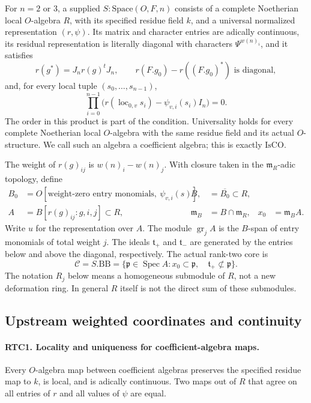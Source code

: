 For \(n=2\) or \(3\), a supplied
\(S:\mathrm{Space}(O,F,n)\) consists of a complete Noetherian
local \(O\)-algebra \(R\), with its specified residue field \(k\),
and a universal normalized representation \((r,\psi)\).  Its
matrix and character entries are adically continuous, its residual
representation is literally diagonal with characters
\(\Psi^{w(n)_i}\), and it satisfies
\[
 r(g^*)=J_nr(g)^tJ_n,\qquad
 r(F.g_0)-r((F.g_0)^*)\text{ is diagonal},
                                                        \tag{RTC.2}
\]
and, for every local tuple \((s_0,\ldots,s_{n-1})\),
\[
 \prod_{i=0}^{n-1}
 \bigl(r(\operatorname{loc}_{0,v}s_i)-\psi_{v,i}(s_i)I_n\bigr)=0.
                                                        \tag{RTC.3}
\]
The order in this product is part of the condition.  Universality
holds for every complete Noetherian local \(O\)-algebra with the
same residue field and its actual \(O\)-structure.  We call such
an algebra a coefficient algebra; this is exactly \(\mathrm{IsCO}\).

The weight of \(r(g)_{ij}\) is \(w(n)_i-w(n)_j\).
With closure taken in the \(\mathfrak m_R\)-adic topology, define
\[
 \begin{aligned}
 B_0&=O[\text{weight-zero entry monomials},\ \psi_{v,i}(s)],
       &B&=\overline{B_0}\subset R,\\
 A&=B[r(g)_{ij}:g,i,j]\subset R,
       &\mathfrak m_B&=B\cap\mathfrak m_R,
       &x_0&=\mathfrak m_B A.
 \end{aligned}                                             \tag{RTC.4}
\]
Write \(u\) for the representation over \(A\).  The module
\(\operatorname{gr}_j A\) is the \(B\)-span of entry monomials
of total weight \(j\).  The ideals \(\mathfrak t_+\) and
\(\mathfrak t_-\) are generated by the entries below and above
the diagonal, respectively.  The actual rank-two core is
\[
 \mathcal C= S.\mathrm{BB}
 =\{\mathfrak p\in\operatorname{Spec}A:
       x_0\subset\mathfrak p,\quad
       \mathfrak t_+\not\subset\mathfrak p\}.
                                                        \tag{RTC.5}
\]
The notation \(R_j\) below means a homogeneous submodule of \(R\),
not a new deformation ring.  In general \(R\) itself is not the
direct sum of these submodules.

\subsection{Upstream weighted coordinates and continuity}

\paragraph{RTC1. Locality and uniqueness for coefficient-algebra maps.}
\label{claim:RTC1}
Every \(O\)-algebra map between coefficient algebras preserves the
specified residue map to \(k\), is local, and is adically continuous.
Two maps out of \(R\) that agree on all entries of \(r\) and all
values of \(\psi\) are equal.

